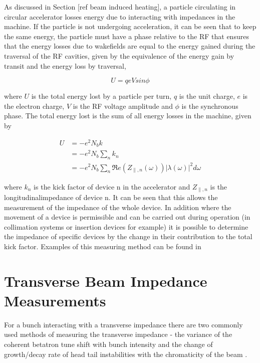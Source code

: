 As discussed in Section [ref beam induced heating], a particle circulating in circular accelerator losses energy due to interacting with impedances in the machine. If the particle is not undergoing acceleration, it can be seen that to keep the same energy, the particle must have a phase relative to the RF that ensures that the energy losses due to wakefields are equal to the energy gained during the traversal of the RF cavities, given by the equivalence of the energy gain by transit and the energy loss by traversal,

\begin{equation}
U = qeVsin\phi
\end{equation}

where $U$ is the total energy lost by a particle per turn, $q$ is the unit charge, $e$ is the electron charge, $V$ is the RF voltage amplitude and $\phi$ is the synchronous phase. The total energy lost is the sum of all energy losses in the machine, given by

\begin{align}
U & = -e^{2}N_{b}k \\
   & = -e^{2}N_{b}\displaystyle\sum\limits_{n} k_{n} \\
   & = -e^{2}N_{b}\displaystyle\sum\limits_{n} \Re{}e\left( Z_{\parallel,n}\left( \omega \right) \right)\left| \lambda \left( \omega \right) \right|^{2} d\omega
\end{align}

where $k_{n}$ is the kick factor of device n in the accelerator and $ Z_{\parallel,n}$ is the longitudinalimpedance of device n. It can be seen that this allows the measurement of the impedance of the whole device. In addition where the movement of a device is permissible and can be carried out during operation (in collimation systems or insertion devices for example) it is possible to determine the impedance of specific devices by the change in their contribution to the total kick factor. Examples of this measuring method can be found in \cite{Bohl:SingleBunchEnLoss, Argyropoulos:longImpInj}

\section{Transverse Beam Impedance Measurements}


For a bunch interacting with a transverse impedance there are two commonly used methods of measuring the transverse impedance - the variance of the coherent betatron tune shift with bunch intensity and the change of growth/decay rate of head tail instabilities with the chromaticity of the beam \cite{Sacherer:BunchBeamEffects}.

